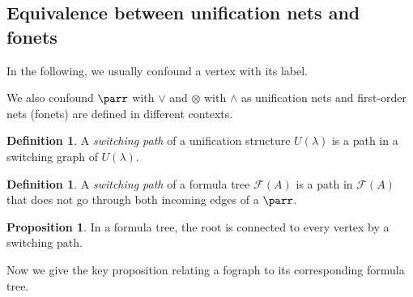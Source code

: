 \documentclass[conference]{IEEEtran}
\theoremstyle{definition}
\newtheorem{definition}[thm]{Definition}
\newtheorem{proposition}[thm]{Proposition}
\newcommand{\FT}{\mathcal{F}}
\begin{document}
\subsection{Equivalence between unification nets and fonets}
In the following, we usually confound a vertex with its label. 

We also confound $\parr$ with $\vee$ and $\otimes$ with $\wedge$ as unification
nets and first-order nets (fonets) are defined in different contexts.

\begin{definition} A \textit{switching path} of a unification structure $U(\lambda)$ is a path in a switching graph of $U(\lambda)$.
\end{definition}

\begin{definition} A \textit{switching path} of a  formula tree $\FT(A)$ is a
	path in $\FT(A)$ that does not go through both incoming edges of a $\parr$.
\end{definition}

\begin{proposition}
\label{prop1}
In a formula tree, the root is connected to every vertex by a switching path.
\end{proposition}

Now we give the key proposition relating a fograph to its corresponding formula
tree.
\end{document}
